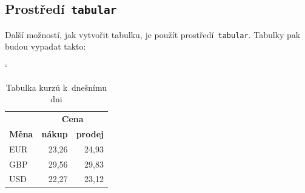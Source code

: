 \documentclass[a4paper, 11pt]{article}
\begin{document}
\subsection{Prostředí\texttt{ tabular }}
Další možností, jak vytvořit tabulku, je použít prostředí\texttt{ tabular}. Tabulky pak
budou vypadat takto\footnotemark:

\bigskip
\begin{table}[h]
	\catcode`
	\centering
	\begin{tabular}{|l|r|r|}
		\hline
		~             & \multicolumn{2}{c|}{\textbf{Cena}}                   \\
		\cline{2-3}
		\textbf{Měna} & \textbf{nákup}                     & \textbf{prodej} \\
		\hline
		EUR           & {23,26}                            & 24,93           \\
		GBP           & 29,56                              & 29,83           \\
		USD           & 22,27                              & 23,12           \\
		\hline
	\end{tabular}
	\caption{Tabulka kurzů k~dnešnímu dni}
	\label{table:kurzy}
\end{table}
\bigskip
\end{document}
